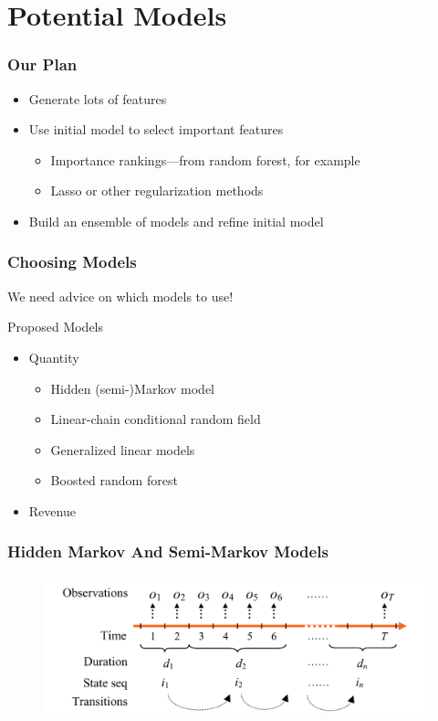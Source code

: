 \documentclass{beamer}
\begin{document}
\section{Potential Models} %

\begin{frame}
  \frametitle{Our Plan}
  \begin{itemize}
    \item Generate lots of features
    \item Use initial model to select important features
    \begin{itemize}
      \item Importance rankings---from random forest, for example
      \item Lasso or other regularization methods
    \end{itemize}
    \item Build an ensemble of models and refine initial model
  \end{itemize}
\end{frame}

\begin{frame}
  \frametitle{Choosing Models}
  We need advice on which models to use!

  \begin{block}{Proposed Models}
  \begin{itemize}
    \item Quantity
    \begin{itemize}
      \item Hidden (semi-)Markov model
      \item Linear-chain conditional random field
      \item Generalized linear models
      \item Boosted random forest
    \end{itemize}

    \item Revenue
  \end{itemize}
  \end{block}
\end{frame}

\begin{frame}
  \frametitle{Hidden Markov And Semi-Markov Models}
  \begin{figure}
	  \centering\includegraphics[scale=0.4]{graphics/semi.png}
	\end {figure}
\end{frame}
\end{document}
